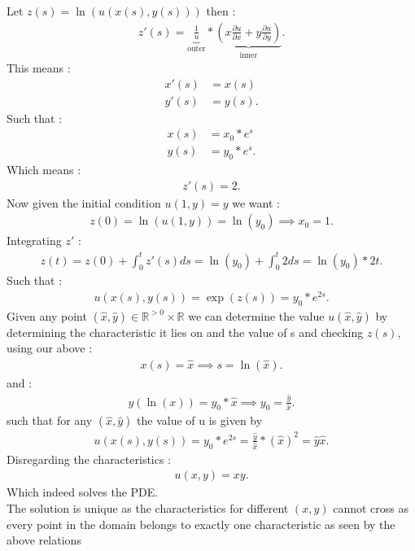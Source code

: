 \begin{solution}
 Let $z(s) = \ln (u(x(s),y(s)))$ then : 
 \begin{align*}
   z'(s) = \underbrace{\frac{1}{u}}_{\text{outer}}* \underbrace{\left( x \frac{\partial u}{\partial x} + y \frac{\partial u}{\partial y} \right) }_{\text{inner}}
 .\end{align*}
 This means  : 
 \begin{align*}
   x'(s) &= x(s)\\
  y'(s) &= y(s)
 .\end{align*}
 Such that :
 \begin{align*}
   x(s) &= x_0*e^s\\
   y(s) &=y_0*e^s
 .\end{align*}
 Which means :
 \begin{align*}
  z'(s) = 2
 .\end{align*}
 Now given the initial condition $u(1,y) = y$ we want :
 \begin{align*}
  z(0) = \ln(u(1,y)) = \ln(y_0) \implies x_0=1 
 .\end{align*}
  Integrating $z'$ : 
  \begin{align*}
    z(t) = z(0) + \int_0^t z'(s) ds = \ln(y_0) + \int_0^t 2 ds = \ln(y_0)*2t
  .\end{align*}
  Such that : 
  \begin{align*}
    u(x(s),y(s)) = \exp(z(s)) = y_0*e^{2s}  
  .\end{align*}
  Given any point $(\hat{x},\hat{y}) \in  \mathbb{R}^{>0} \times  \mathbb{R} $ we can determine the value $u(\hat{x},\hat{y} )$ by determining
  the characteristic it lies on and the value of s and checking $z(s)$, using our above  : 
  \begin{align*}
    x(s) = \hat{x}  \implies s = \ln(\hat{x}) 
  .\end{align*}
  and : 
  \begin{align*}
    y(\ln(x)) = y_0*\hat{x}  \implies y_0 = \frac{\hat{y} }{\hat{x} }  
  .\end{align*}
  such that for any $(\hat{x},\hat{y}  )$ the value of u is given by 
  \begin{align*}
    u(x(s),y(s)) =  y_0*e^{2s} = \frac{\hat{y} }{\hat{x} }*(\hat{x} )^2 = \hat{y}\hat{x}    
  .\end{align*}
  Disregarding the characteristics : 
  \begin{align*}
    u(x,y) = xy
  .\end{align*}
  Which indeed solves the PDE. \\[1ex]
  The solution is unique as the characteristics for different $(x,y)$ cannot cross as every point in the domain belongs to exactly one characteristic as seen by the above relations
\end{solution}
